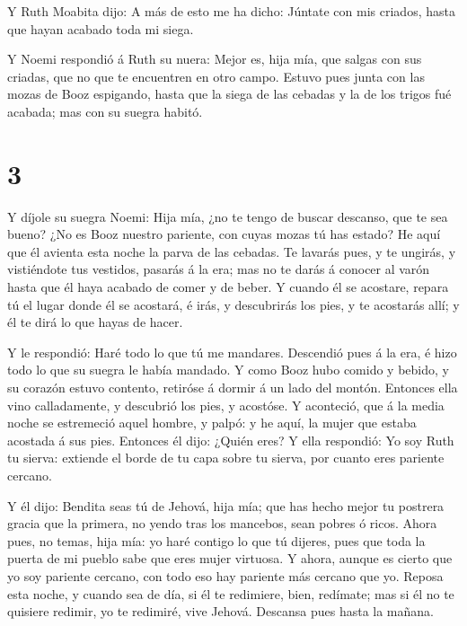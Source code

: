  Y Ruth Moabita dijo: A más de esto me ha dicho: Júntate
con mis criados, hasta que hayan acabado toda mi siega.

 Y Noemi respondió á Ruth su nuera: Mejor es, hija mía, que
salgas con sus criadas, que no que te encuentren en otro campo.
 Estuvo pues junta con las mozas de Booz espigando, hasta
que la siega de las cebadas y la de los trigos fué acabada; mas con su
suegra habitó.

\hypertarget{section-2}{%
\section{3}\label{section-2}}

 Y díjole su suegra Noemi: Hija mía, ¿no te tengo de buscar
descanso, que te sea bueno?  ¿No es Booz nuestro pariente,
con cuyas mozas tú has estado? He aquí que él avienta esta noche la
parva de las cebadas.  Te lavarás pues, y te ungirás, y
vistiéndote tus vestidos, pasarás á la era; mas no te darás á conocer al
varón hasta que él haya acabado de comer y de beber.  Y
cuando él se acostare, repara tú el lugar donde él se acostará, é irás,
y descubrirás los pies, y te acostarás allí; y él te dirá lo que hayas
de hacer.

 Y le respondió: Haré todo lo que tú me mandares.
 Descendió pues á la era, é hizo todo lo que su suegra le
había mandado.  Y como Booz hubo comido y bebido, y su
corazón estuvo contento, retiróse á dormir á un lado del montón.
Entonces ella vino calladamente, y descubrió los pies, y acostóse.
 Y aconteció, que á la media noche se estremeció aquel
hombre, y palpó: y he aquí, la mujer que estaba acostada á sus pies.
 Entonces él dijo: ¿Quién eres? Y ella respondió: Yo soy
Ruth tu sierva: extiende el borde de tu capa sobre tu sierva, por cuanto
eres pariente cercano.

 Y él dijo: Bendita seas tú de Jehová, hija mía; que has
hecho mejor tu postrera gracia que la primera, no yendo tras los
mancebos, sean pobres ó ricos.  Ahora pues, no temas, hija
mía: yo haré contigo lo que tú dijeres, pues que toda la puerta de mi
pueblo sabe que eres mujer virtuosa.  Y ahora, aunque es
cierto que yo soy pariente cercano, con todo eso hay pariente más
cercano que yo.  Reposa esta noche, y cuando sea de día, si
él te redimiere, bien, redímate; mas si él no te quisiere redimir, yo te
redimiré, vive Jehová. Descansa pues hasta la mañana.


